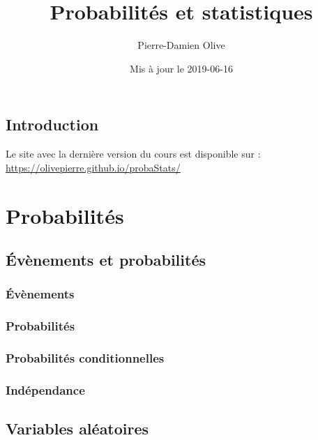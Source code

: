 \documentclass[]{book}
\title{Probabilités et statistiques}
\author{Pierre-Damien Olive}
\date{Mis à jour le 2019-06-16}
\theoremstyle{definition}
\theoremstyle{definition}
\theoremstyle{definition}
\theoremstyle{remark}
\begin{document}
\maketitle

{
\setcounter{tocdepth}{1}
\tableofcontents
}
\hypertarget{introduction}{%
\chapter*{Introduction}\label{introduction}}

Le site avec la dernière version du cours est disponible sur : \url{https://olivepierre.github.io/probaStats/}

\hypertarget{part-probabilites}{%
\part{Probabilités}\label{part-probabilites}}

\hypertarget{evenements-et-probabilites}{%
\chapter{Évènements et probabilités}\label{evenements-et-probabilites}}

\hypertarget{evenements}{%
\section{Évènements}\label{evenements}}

\hypertarget{probabilites}{%
\section{Probabilités}\label{probabilites}}

\hypertarget{probabilites-conditionnelles}{%
\section{Probabilités conditionnelles}\label{probabilites-conditionnelles}}

\hypertarget{independance}{%
\section{Indépendance}\label{independance}}

\hypertarget{variables-aleatoires}{%
\chapter{Variables aléatoires}\label{variables-aleatoires}}
\end{document}

